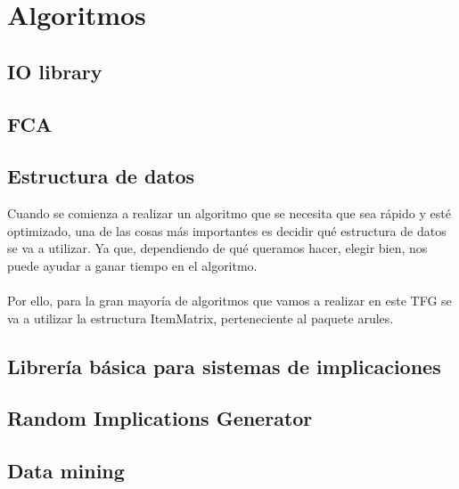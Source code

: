 \section{Algoritmos}
\subsection{IO library}



\subsection{FCA}





\subsection{Estructura de datos}

Cuando se comienza a realizar un algoritmo que se necesita que 
sea r\'apido y est\'e optimizado, una de las cosas m\'as importantes 
es decidir qu\'e estructura de datos se va a utilizar.
Ya que, dependiendo de qu\'e queramos hacer, elegir bien, nos puede 
ayudar a ganar tiempo en el algoritmo.
\\
\\
Por ello, para la gran mayor\'ia de algoritmos que vamos a realizar 
en este TFG se va a utilizar la estructura ItemMatrix, perteneciente al paquete 
arules.

\subsection{Librer\'ia b\'asica para sistemas de implicaciones}


\subsection{Random Implications Generator}


\subsection{Data mining}




\newpage
\thispagestyle{empty}
\mbox{}

\newpage